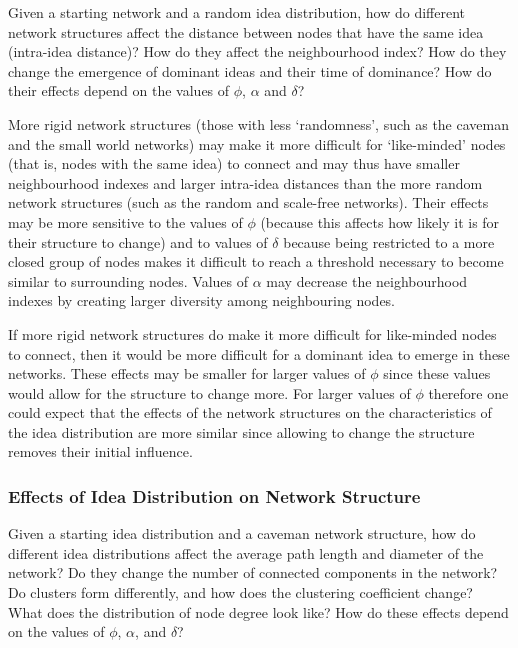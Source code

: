 Given a starting network and a random idea distribution, how do different network structures affect the distance between nodes that have the same idea (intra-idea distance)? How do they affect the neighbourhood index? How do they change the emergence of dominant ideas and their time of dominance? How do their effects depend on the values of $\phi$, $\alpha$ and $\delta$?


More rigid network structures (those with less `randomness', such as the caveman and the small world networks) may make it more difficult for `like-minded' nodes (that is, nodes with the same idea) to connect and may thus have smaller neighbourhood indexes and larger intra-idea distances than the more random network structures (such as the random and scale-free networks). Their effects may be more sensitive to the values of $\phi$ (because this affects how likely it is for their structure to change) and to values of $\delta$ because being restricted to a more closed group of nodes makes it difficult to reach a threshold necessary to become similar to surrounding nodes. Values of $\alpha$ may decrease the neighbourhood indexes by creating larger diversity among neighbouring nodes.

If more rigid network structures do make it more difficult for like-minded nodes to connect, then it would be more difficult for a dominant idea to emerge in these networks. These effects may be smaller for larger values of $\phi$ since these values would allow for the structure to change more. For larger values of $\phi$ therefore one could expect that the effects of the network structures on the characteristics of the idea distribution are more similar since allowing to change the structure removes their initial influence.


\subsubsection{Effects of Idea Distribution on Network Structure}

Given a starting idea distribution and a caveman network structure, how do different idea distributions affect the average path length and diameter of the network? Do they change the number of connected components in the network? Do clusters form differently, and how does the clustering coefficient change? What does the distribution of node degree look like? How do these effects depend on the values of $\phi$, $\alpha$, and $\delta$?


